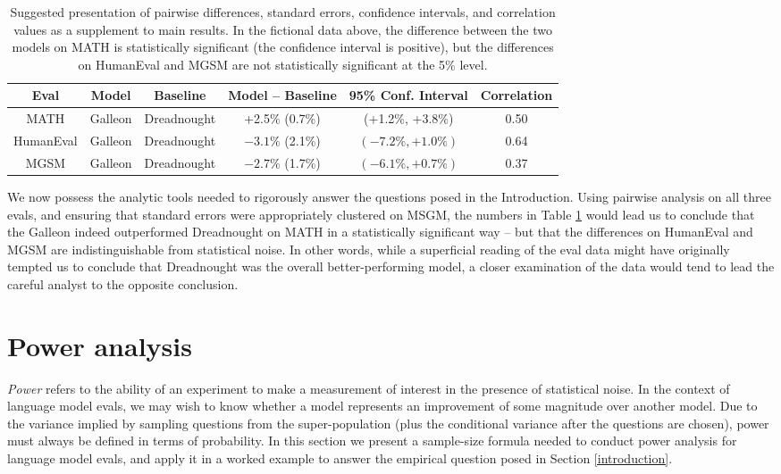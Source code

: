 \documentclass[11pt, oneside]{article}   	%
\begin{document}
\begin{table}
\begin{center}
\begin{tabular}{ |c|c|c|c|c|c| }
\hline
Eval & Model & Baseline & Model -- Baseline & 95\% Conf. Interval & Correlation \\
\hline
MATH & Galleon & Dreadnought & +2.5\% (0.7\%) & (+1.2\%, +3.8\%) & 0.50 \\
\hline
HumanEval & Galleon & Dreadnought & $-3.1\%$ (2.1\%) & $(-7.2\%, +1.0\%)$ & 0.64 \\
\hline
MGSM & Galleon & Dreadnought & $-2.7\%$ (1.7\%) & $(-6.1\%, +0.7\%)$ & 0.37 \\
\hline
\end{tabular}
\caption{Suggested presentation of pairwise differences, standard errors, confidence intervals, and correlation values as a supplement to main results. In the fictional data above, the difference between the two models on MATH is statistically significant (the confidence interval is positive), but the differences on HumanEval and MGSM are not statistically significant at the 5\% level.}
\label{faketable:pairwise}
\end{center}
\end{table}

We now possess the analytic tools needed to rigorously answer the questions posed in the Introduction. Using pairwise analysis on all three evals, and ensuring that standard errors were appropriately clustered on MSGM, the numbers in Table \ref{faketable:pairwise} would lead us to conclude that the Galleon indeed outperformed Dreadnought on MATH in a statistically significant way – but that the differences on HumanEval and MGSM are indistinguishable from statistical noise. In other words, while a superficial reading of the eval data might have originally tempted us to conclude that Dreadnought was the overall better-performing model, a closer examination of the data would tend to lead the careful analyst to the opposite conclusion.

\section{Power analysis}

{\em Power} refers to the ability of an experiment to make a measurement of interest in the presence of statistical noise.\cite{NBERw15701} In the context of language model evals, we may wish to know whether a model represents an improvement of some magnitude over another model.\cite{card2020littlepowercomesgreat} Due to the variance implied by sampling questions from the super-population (plus the conditional variance after the questions are chosen), power must always be defined in terms of probability. In this section we present a sample-size formula needed to conduct power analysis for language model evals, and apply it in a worked example to answer the empirical question posed in Section \ref{introduction}.
\end{document}
